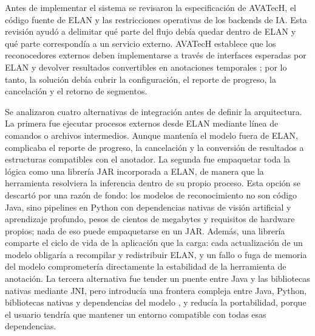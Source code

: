Antes de implementar el sistema se revisaron la especificación de AVATecH, el código fuente de ELAN y las restricciones operativas de los backends de IA. Esta revisión ayudó a delimitar qué parte del flujo debía quedar dentro de ELAN y qué parte correspondía a un servicio externo. AVATecH establece que los reconocedores externos deben implementarse a través de interfaces esperadas por ELAN y devolver resultados convertibles en anotaciones temporales \cite{auer2014avatech}; por lo tanto, la solución debía cubrir la configuración, el reporte de progreso, la cancelación y el retorno de segmentos.

Se analizaron cuatro alternativas de integración antes de definir la arquitectura. La primera fue ejecutar procesos externos desde ELAN mediante línea de comandos o archivos intermedios. Aunque mantenía el modelo fuera de ELAN, complicaba el reporte de progreso, la cancelación y la conversión de resultados a estructuras compatibles con el anotador. La segunda fue empaquetar toda la lógica como una librería JAR incorporada a ELAN, de manera que la herramienta resolviera la inferencia dentro de su propio proceso. Esta opción se descartó por una razón de fondo: los modelos de reconocimiento no son código Java, sino pipelines en Python con dependencias nativas de visión artificial y aprendizaje profundo, pesos de cientos de megabytes y requisitos de hardware propios; nada de eso puede empaquetarse en un JAR. Además, una librería comparte el ciclo de vida de la aplicación que la carga: cada actualización de un modelo obligaría a recompilar y redistribuir ELAN, y un fallo o fuga de memoria del modelo comprometería directamente la estabilidad de la herramienta de anotación. La tercera alternativa fue tender un puente entre Java y las bibliotecas nativas mediante JNI, pero introducía una frontera compleja entre Java, Python, bibliotecas nativas y dependencias del modelo \cite{oracle_jni}, y reducía la portabilidad, porque el usuario tendría que mantener un entorno compatible con todas esas dependencias.

